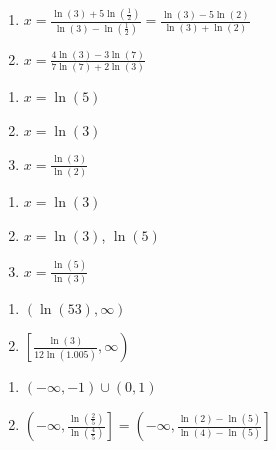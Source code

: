 \begin{multicols}{2}
\begin{enumerate}
\setcounter{enumi}{\value{HW}}


\item $x = \frac{\ln(3) + 5\ln\left(\frac{1}{2}\right)}{\ln(3) - \ln\left(\frac{1}{2}\right)} = \frac{\ln(3)-5\ln(2)}{\ln(3)+\ln(2)}$
\item  $x = \frac{4 \ln(3) - 3 \ln(7)}{7 \ln(7) + 2 \ln(3)}$

\setcounter{HW}{\value{enumi}}
\end{enumerate}
\end{multicols}

\begin{multicols}{3}
\begin{enumerate}
\setcounter{enumi}{\value{HW}}

\item $x=\ln(5)$
\item $x=\ln(3)$
\item $x=\frac{\ln(3)}{\ln(2)}$


\setcounter{HW}{\value{enumi}}
\end{enumerate}
\end{multicols}

\begin{multicols}{3}
\begin{enumerate}
\setcounter{enumi}{\value{HW}}

\item $x=\ln(3)$
\item $x=\ln(3)$, $\ln(5)$
\item $x=\frac{\ln(5)}{\ln(3)}$


\setcounter{HW}{\value{enumi}}
\end{enumerate}
\end{multicols}

\begin{multicols}{2} 
\begin{enumerate}
\setcounter{enumi}{\value{HW}}

\item $(\ln(53), \infty)$
\item $\left[\frac{\ln(3)}{12\ln(1.005)}, \infty\right)$

\setcounter{HW}{\value{enumi}}
\end{enumerate}
\end{multicols}

\begin{multicols}{2} 
\begin{enumerate}
\setcounter{enumi}{\value{HW}}

\item $(-\infty, -1) \cup (0, 1)$
\item $\left(-\infty, \frac{\ln\left(\frac{2}{5}\right)}{\ln\left(\frac{4}{5}\right)} \right] = \left(-\infty, \frac{\ln(2)-\ln(5)}{\ln(4)-\ln(5)} \right]$

\setcounter{HW}{\value{enumi}}
\end{enumerate}
\end{multicols}

